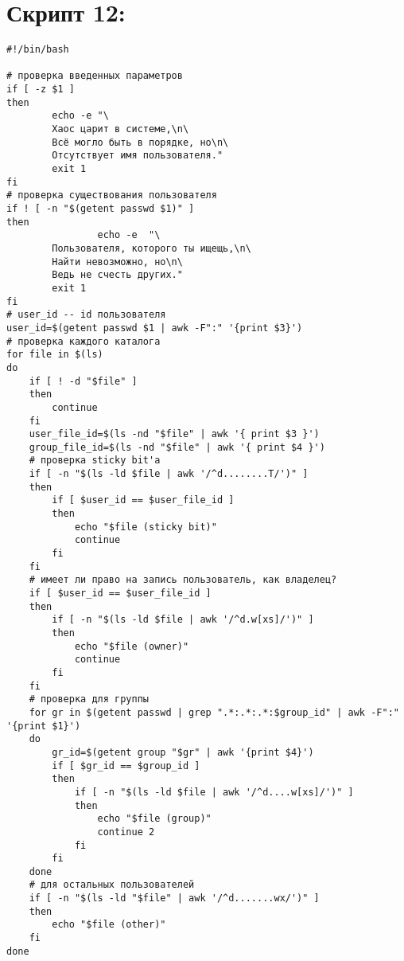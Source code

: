 \documentclass[12pt, a4paper]{article}
\begin{document}
\section*{Скрипт 12:}
\begin{verbatim}
#!/bin/bash

# проверка введенных параметров
if [ -z $1 ]
then
        echo -e "\
        Хаос царит в системе,\n\
        Всё могло быть в порядке, но\n\
        Отсутствует имя пользователя."
        exit 1
fi
# проверка существования пользователя
if ! [ -n "$(getent passwd $1)" ] 
then
				echo -e  "\
        Пользователя, которого ты ищещь,\n\
        Найти невозможно, но\n\
        Ведь не счесть других."
        exit 1
fi
# user_id -- id пользователя 
user_id=$(getent passwd $1 | awk -F":" '{print $3}')
# проверка каждого каталога
for file in $(ls) 
do
	if [ ! -d "$file" ]
	then
		continue
	fi
	user_file_id=$(ls -nd "$file" | awk '{ print $3 }')
	group_file_id=$(ls -nd "$file" | awk '{ print $4 }')
	# проверка sticky bit'а
	if [ -n "$(ls -ld $file | awk '/^d........T/')" ]
	then 
		if [ $user_id == $user_file_id ]  
		then
			echo "$file (sticky bit)"
			continue
		fi
	fi
	# имеет ли право на запись пользователь, как владелец?
	if [ $user_id == $user_file_id ]
	then
		if [ -n "$(ls -ld $file | awk '/^d.w[xs]/')" ]
		then
			echo "$file (owner)"
			continue
		fi
	fi
	# проверка для группы
	for gr in $(getent passwd | grep ".*:.*:.*:$group_id" | awk -F":" '{print $1}')
	do
		gr_id=$(getent group "$gr" | awk '{print $4}')
		if [ $gr_id == $group_id ]
		then
			if [ -n "$(ls -ld $file | awk '/^d....w[xs]/')" ]
			then
				echo "$file (group)"
				continue 2
			fi
		fi
	done
	# для остальных пользователей
	if [ -n "$(ls -ld "$file" | awk '/^d.......wx/')" ]
	then
		echo "$file (other)"
	fi
done

\end{verbatim}
\end{document}
